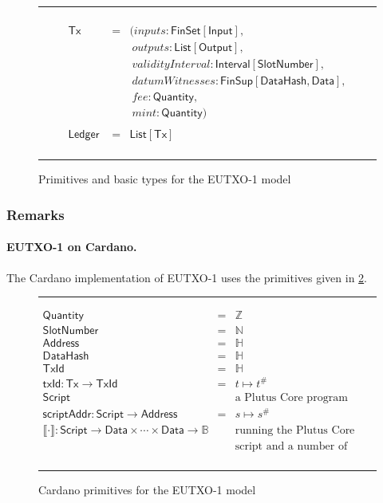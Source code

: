 \documentclass[a4paper]{article}
\renewcommand{\i}{\textit}  %
\newcommand{\s}{\textsf}  %
\newcommand{\msf}[1]{\ensuremath{\mathsf{#1}}}
\newcommand{\mi}[1]{\ensuremath{\mathit{#1}}}
\newcommand\rfskip{7pt}
\newenvironment{ruledfigure}[1]{\begin{figure}[#1]\hrule\vspace{\rfskip}}{\vspace{\rfskip}\hrule\end{figure}}
\newcommand{\hash}[1]{\ensuremath{#1^{\#}}}
\newcommand{\List}[1]{\ensuremath{\s{List}[#1]}}
\newcommand{\FinSet}[1]{\ensuremath{\s{FinSet}[#1]}}
\newcommand{\Interval}[1]{\ensuremath{\s{Interval}[#1]}}
\newcommand{\FinSup}[2]{\ensuremath{\s{FinSup}[#1,#2]}}
\newcommand{\script}{\ensuremath{\s{Script}}}
\newcommand{\scriptAddr}{\msf{scriptAddr}}
\newcommand{\TxId}{\ensuremath{\s{TxId}}}
\newcommand{\txId}{\msf{txId}}
\newcommand{\Address}{\ensuremath{\s{Address}}}
\newcommand{\DataHash}{\ensuremath{\s{DataHash}}}
\newcommand{\inputs}{\mi{inputs}}
\newcommand{\outputs}{\mi{outputs}}
\newcommand{\mint}{\mi{mint}}
\newcommand{\fee}{\mi{fee}}
\newcommand{\datumWits}{\mi{datumWitnesses}}
\newcommand{\Data}{\ensuremath{\s{Data}}}
\newcommand{\slotnum}{\ensuremath{\s{SlotNumber}}}
\newcommand{\eutxotx}{\msf{Tx}}
\newcommand{\qty}{\ensuremath{\s{Quantity}}}
\newcommand{\applyScript}[1]{\ensuremath{\llbracket#1\rrbracket}}
\newcommand\B{\ensuremath{\mathbb{B}}}
\newcommand\N{\ensuremath{\mathbb{N}}}
\newcommand\Z{\ensuremath{\mathbb{Z}}}
\renewcommand\H{\ensuremath{\mathbb{H}}}
\begin{document}
\begin{ruledfigure}{H}
\begin{displaymath}
\begin{array}{rll}
     \\
     \eutxotx\s{ } &=&(\inputs: \FinSet{\s{Input}},\\
                   & &\ \outputs: \List{\s{Output}},\\
                   & &\ \i{validityInterval}: \Interval{\slotnum},\\
                   & &\ \datumWits: \FinSup{\DataHash}{\Data},\\
                   & &\ \fee: \qty,\\
                   & &\ \mint: \qty) \\
     \\
     \s{Ledger } &=&\!\List{\eutxotx}\\
  \end{array}
  \end{displaymath}
  \caption{Primitives and basic types for the EUTXO-1 model}
  \label{fig:eutxo-1-types}
\end{ruledfigure}

\subsubsection{Remarks}
\paragraph{EUTXO-1 on Cardano.}
The Cardano implementation of EUTXO-1 uses the primitives given in
\cref{fig:eutxo-1-types-cardano}.

\begin{ruledfigure}{H}
  \begin{displaymath}
  \begin{array}{rll}
    \qty{} &=& \Z\\
    \slotnum &=& \N\\
    \Address &=& \H\\
    \DataHash &=& \H\\
    \TxId &=& \H\\
    \txId : \eutxotx \rightarrow \TxId &=& t \mapsto \hash{t}\\
    \script & & \mbox{a Plutus Core program}\\
    \scriptAddr : \script \rightarrow \Address &=& s \mapsto \hash{s}\\
    \applyScript{\cdot} : \script \rightarrow \Data \times \cdots \times
    \Data \rightarrow \B & & \mbox{running the Plutus Core interpreter with a}\\
                             &&\mbox{script and a number of data objects as input}\\
  \end{array}
  \end{displaymath}
  \caption{Cardano primitives for the EUTXO-1 model}
  \label{fig:eutxo-1-types-cardano}
\end{ruledfigure}
\end{document}
